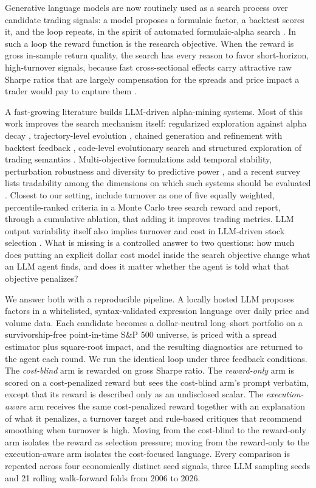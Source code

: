 \documentclass[preprint,12pt,authoryear]{elsarticle}
\begin{document}
Generative language models are now routinely used as a search process over candidate trading signals: a model proposes a formulaic factor, a backtest scores it, and the loop repeats, in the spirit of automated formulaic-alpha search \citep{kakushadze2016}. In such a loop the reward function is the research objective. When the reward is gross in-sample return quality, the search has every reason to favor short-horizon, high-turnover signals, because fast cross-sectional effects carry attractive raw Sharpe ratios that are largely compensation for the spreads and price impact a trader would pay to capture them \citep{korajczyk2004,novymarx2016}.

A fast-growing literature builds LLM-driven alpha-mining systems. Most of this work improves the search mechanism itself: regularized exploration against alpha decay \citep{tang2025}, trajectory-level evolution \citep{han2026}, chained generation and refinement with backtest feedback \citep{cao2025}, code-level evolutionary search \citep{liu2026} and structured exploration of trading semantics \citep{yi2026}. Multi-objective formulations add temporal stability, perturbation robustness and diversity to predictive power \citep{zhao2026}, and a recent survey lists tradability among the dimensions on which such systems should be evaluated \citep{yu2026}. Closest to our setting, \citet{shi2026} include turnover as one of five equally weighted, percentile-ranked criteria in a Monte Carlo tree search reward and report, through a cumulative ablation, that adding it improves trading metrics. LLM output variability itself also implies turnover and cost in LLM-driven stock selection \citep{chon2025}. What is missing is a controlled answer to two questions: how much does putting an explicit dollar cost model inside the search objective change what an LLM agent finds, and does it matter whether the agent is told what that objective penalizes?

We answer both with a reproducible pipeline. A locally hosted LLM proposes factors in a whitelisted, syntax-validated expression language over daily price and volume data. Each candidate becomes a dollar-neutral long--short portfolio on a survivorship-free point-in-time S\&P 500 universe, is priced with a \citet{corwin2012} spread estimator plus square-root impact, and the resulting diagnostics are returned to the agent each round. We run the identical loop under three feedback conditions. The \emph{cost-blind} arm is rewarded on gross Sharpe ratio. The \emph{reward-only} arm is scored on a cost-penalized reward but sees the cost-blind arm's prompt verbatim, except that its reward is described only as an undisclosed scalar. The \emph{execution-aware} arm receives the same cost-penalized reward together with an explanation of what it penalizes, a turnover target and rule-based critiques that recommend smoothing when turnover is high. Moving from the cost-blind to the reward-only arm isolates the reward as selection pressure; moving from the reward-only to the execution-aware arm isolates the cost-focused language. Every comparison is repeated across four economically distinct seed signals, three LLM sampling seeds and 21 rolling walk-forward folds from 2006 to 2026.
\end{document}
